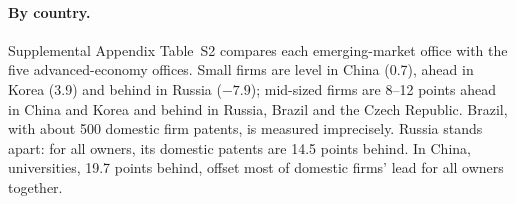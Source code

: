 \paragraph{By country.} Supplemental Appendix Table~S2 compares each emerging-market office with the five
advanced-economy offices. Small firms are level in China (0.7), ahead in Korea (3.9) and behind in Russia ($-7.9$); mid-sized firms are 8--12
points ahead in China and Korea and behind in Russia, Brazil and the Czech Republic. Brazil, with about 500 domestic
firm patents, is measured imprecisely. Russia stands apart: for all owners, its domestic patents are 14.5 points behind. In China, universities, 19.7
points behind, offset most of domestic firms' lead for all owners together.
